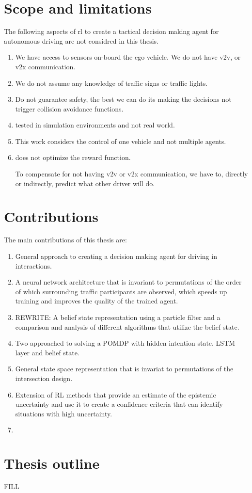\section{Scope and limitations}
\label{sec:scope}
The following aspects of \gls{rl} to create a tactical decision making agent for autonomous driving are not considred in this thesis. 

\begin{enumerate}
	\item We have access to sensors on-board the ego vehicle. We do not have v2v, or v2x communication. 
	\item We do not assume any knowledge of traffic signs or traffic lights. 
	\item Do not guarantee safety, the best we can do its making the decisions not trigger collision avoidance functions. 
	\item tested in simulation environments and not real world. 
	\item This work considers the control of one vehicle and not multiple agents. 
	\item does not optimize the reward function. 
	
	To compensate for not having v2v or v2x communication, we have to, directly or indirectly, predict what other driver will do. 
	
\end{enumerate}


\section{Contributions}
\label{sec:contributions}
The main contributions of this thesis are:
\begin{enumerate}
	\item General approach to creating a decision making agent for driving in interactions. 
	\item A neural network architecture that is invariant to permutations of the order of which surrounding traffic participants are observed, which speeds up training and improves the quality of the trained agent. 
	\item REWRITE: A belief state representation using a particle filter and a comparison and analysis of different algorithms that utilize the belief state. 
	\item Two approached to solving a POMDP with hidden intention state. LSTM layer and belief state. 
	\item General state space representation that is invariat to permutations of the intersection design. 
	\item Extension of RL methods that provide an estimate of the epistemic uncertainty and use it to create a confidence criteria that can identify situations with high uncertainty. 
	\item {}

\end{enumerate}


\section{Thesis outline}
FILL


